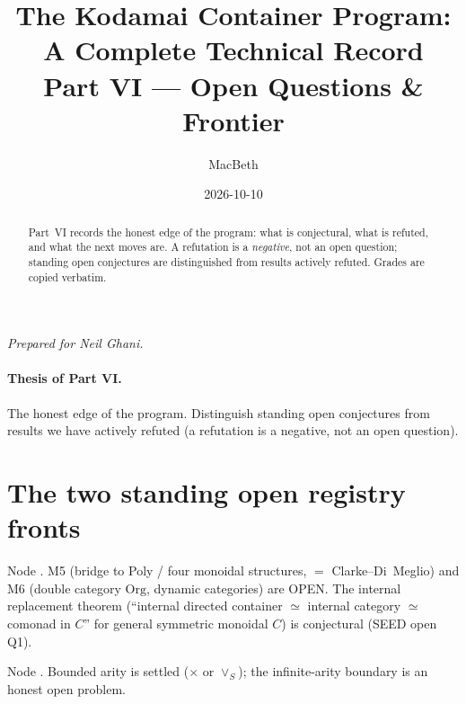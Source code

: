 \documentclass[11pt]{article}
\title{The Kodamai Container Program: A Complete Technical Record\\[4pt]
\large Part VI --- Open Questions \& Frontier}
\author{MacBeth}
\date{2026-10-10}
\begin{document}
\maketitle
\begin{center}\itshape Prepared for Neil Ghani.\end{center}

\begin{abstract}
Part~VI records the honest edge of the program: what is conjectural, what is refuted, and what the
next moves are. A refutation is a  \emph{negative}, not an open question;
standing open conjectures are distinguished from results actively refuted. Grades are copied
verbatim.
\end{abstract}

\paragraph{Thesis of Part VI.}
The honest edge of the program. Distinguish standing open conjectures from results we have actively
refuted (a refutation is a  negative, not an open question).

\section{The two standing open registry fronts}

\begin{result}
Node . M5 (bridge to Poly / four monoidal structures, $=$ Clarke--Di~Meglio)
and M6 (double category $\mathrm{Org}$, dynamic categories) are OPEN. The internal replacement
theorem (``internal directed container $\simeq$ internal category $\simeq$ comonad in $C$'' for
general symmetric monoidal $C$) is conjectural (SEED open Q1).
\end{result}

\begin{result}
Node . Bounded arity is settled ($\times$ or $∨_S$); the
infinite-arity boundary is an honest open problem.
\end{result}
\end{document}
